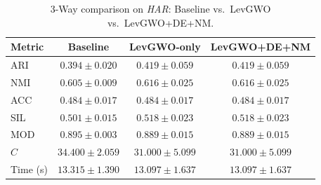 \begin{table}[htbp]
\centering
\caption{3-Way comparison on \textit{HAR}: Baseline vs.\ LevGWO vs.\ LevGWO+DE+NM.}
\label{tab:har_3way}
\begin{tabular}{lccc}
\toprule
Metric & Baseline & LevGWO-only & LevGWO+DE+NM \\
\midrule
ARI & $0.394 \pm 0.020$ & $\mathbf{0.419 \pm 0.059}$ & $\mathbf{0.419 \pm 0.059}$ \\
NMI & $0.605 \pm 0.009$ & $\mathbf{0.616 \pm 0.025}$ & $\mathbf{0.616 \pm 0.025}$ \\
ACC & $0.484 \pm 0.017$ & $\mathbf{0.484 \pm 0.017}$ & $\mathbf{0.484 \pm 0.017}$ \\
SIL & $0.501 \pm 0.015$ & $\mathbf{0.518 \pm 0.023}$ & $\mathbf{0.518 \pm 0.023}$ \\
MOD & $\mathbf{0.895 \pm 0.003}$ & $0.889 \pm 0.015$ & $0.889 \pm 0.015$ \\
$C$ & $34.400 \pm 2.059$ & $31.000 \pm 5.099$ & $31.000 \pm 5.099$ \\
Time (s) & $13.315 \pm 1.390$ & $13.097 \pm 1.637$ & $13.097 \pm 1.637$ \\
\bottomrule
\end{tabular}
\end{table}